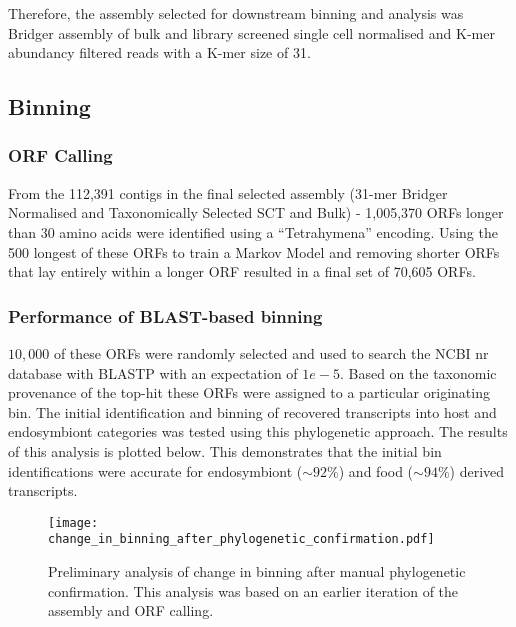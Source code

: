 Therefore, the assembly selected for downstream binning and analysis was Bridger 
assembly of bulk and library screened single cell normalised and K-mer
abundancy filtered reads with a K-mer size of 31.

\subsection{Binning}

\subsubsection{ORF Calling}

From the 112,391 contigs in the final selected assembly (31-mer Bridger
Normalised and Taxonomically Selected SCT and Bulk) - 1,005,370 ORFs
longer than 30 amino acids were identified using a ``Tetrahymena'' encoding.
Using the 500 longest of these ORFs to train a Markov Model and removing
shorter ORFs that lay entirely within a longer ORF resulted in a final set
of 70,605 ORFs.

\subsubsection{Performance of BLAST-based binning}
\(10,000\) of these ORFs were randomly selected and used to search the NCBI
nr database with BLASTP with an expectation of \(1e-5\).  Based on the taxonomic
provenance of the top-hit these ORFs were assigned to a particular originating
bin.  
The initial identification and binning of recovered transcripts into host and endosymbiont categories was 
tested using this phylogenetic approach. The results of this analysis is plotted 
below. This demonstrates that the initial bin identifications were accurate for
endosymbiont (\(\sim92\%\)) and food (\(\sim94\%\)) derived transcripts. 

\begin{figure}[h]
    \texttt{[image: change\_in\_binning\_after\_phylogenetic\_confirmation.pdf]}
    \caption{Preliminary analysis of change in binning after manual phylogenetic confirmation.
    	This analysis was based on an earlier iteration of the assembly and ORF calling.}
\end{figure}

